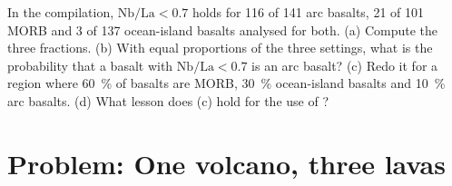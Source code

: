 \begin{exercise}[$\star\star\star$]\label{exo:b2:magmatic-series:12}
In the compilation, $\mathrm{Nb}/\mathrm{La} < 0.7$ holds for 116 of 141 arc basalts,
21 of 101 MORB and 3 of 137 ocean-island basalts analysed for both. (a) Compute the
three fractions. (b) With equal proportions of the three settings, what is the
probability that a basalt with $\mathrm{Nb}/\mathrm{La} < 0.7$ is an arc basalt? (c)
Redo it for a region where \qty{60}{\percent} of basalts are MORB, \qty{30}{\percent}
ocean-island basalts and \qty{10}{\percent} arc basalts. (d) What lesson does (c)
hold for the use of ?
\end{exercise}

\section{Problem: One volcano, three lavas}

